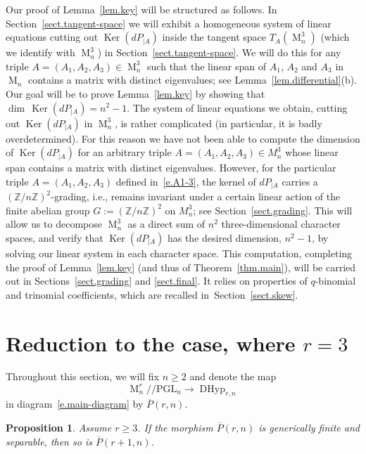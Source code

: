 \documentclass[12pt]{amsart}
\numberwithin{equation}{section}
\numberwithin{subsection}{section}
\newtheorem{proposition}[theorem]{Proposition}
\theoremstyle{definition} \newtheorem{definition}[theorem]{Definition}
\newcommand\DHyp{\operatorname{DHyp}}
\newcommand{\PGL}{\mathrm{PGL}}
\newcommand\bbZ{\mathbb{Z}}
\newcommand\Ker{\operatorname{Ker}}
\newcommand{\Mat}{\operatorname{M}}
\begin{document}
Our proof of Lemma~\ref{lem.key} will be structured as follows.
In Section~\ref{sect.tangent-space} we will exhibit a homogeneous system 
of linear equations cutting out $\Ker(dP_{|A})$ 
inside the tangent space $T_A(\Mat_n^3)$
(which we identify with $\Mat_n^3$) in Section~\ref{sect.tangent-space}.
We will do this for any triple $A = (A_1, A_2, A_3) \in \Mat_n^3$
such that the linear span of $A_1$, $A_2$ and $A_3$ in $\Mat_n$
contains a matrix with distinct eigenvalues; 
see Lemma~\ref{lem.differential}(b).
Our goal will be to prove Lemma~\ref{lem.key} by showing that
$\dim \, \Ker(dP_{|A}) = n^2 - 1$.
The system of linear equations we obtain, cutting out $\Ker(dP_{|A})$
in $\Mat_n^3$, is rather complicated (in particular, it is badly 
overdetermined). For this reason we have not been able to compute 
the dimension of $\Ker(dP_{|A})$ for an arbitrary triple 
$A = (A_1, A_2, A_3) \in M_n^3$ whose linear span contains
a matrix with distinct eigenvalues.
However, for the particular triple $A = (A_1, A_2, A_3)$ 
defined in~\eqref{e.A1-3}, the kernel of $dP_{|A}$ 
carries a $(\bbZ/n \bbZ)^2$-grading, i.e., 
remains invariant under a certain linear action of 
the finite abelian group $G := (\bbZ/n \bbZ)^2$ on $M_n^3$; see
Section~\ref{sect.grading}.  This will allow us to 
decompose $\Mat_n^3$ as a direct sum of $n^2$ three-dimensional 
character spaces, and verify that $\Ker(dP_{|A})$ has the desired dimension,
$n^2 - 1$, by solving our linear system in each character space. 
This computation, completing the proof of Lemma~\ref{lem.key}
(and thus of Theorem~\ref{thm.main}), will be 
carried out in Sections~\ref{sect.grading} and \ref{sect.final}. 
 It relies on properties of 
$q$-binomial and trinomial coefficients, which are recalled 
in~Section~\ref{sect.skew}.

\section{Reduction to the case, where $r = 3$}
\label{sect.r=3}

Throughout this section, we will fix $n \geqslant 2$ and
denote the map
\[ \Mat_n^r/\! \!/\PGL_n \to \DHyp_{r, n} \]
in diagram~\eqref{e.main-diagram} by $\overline{P}(r, n)$. 

\begin{proposition} \label{prop.r+} Assume $r \geqslant 3$. 
If the morphism
$\overline{P}(r, n)$ is generically finite and separable, 
then so is $\overline{P}(r + 1, n)$.
\end{proposition}
\end{document}
